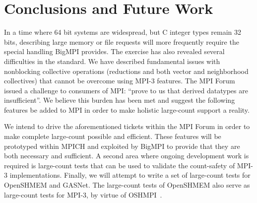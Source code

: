 
\section{Conclusions and Future Work}

In a time where 64 bit systems are widespread,
but C integer types remain 32 bits, describing large memory or file requests
will more frequently require the special handling BigMPI provides.
The exercise has also revealed several difficulties in the standard.
We have described fundamental issues with nonblocking
collective operations (reductions and both vector and neighborhood collectives)
that cannot be overcome using MPI-3 features.
The MPI Forum issued a challenge to consumers of MPI:
``prove to us that derived datatypes are insufficient''.
We believe this burden has been met and suggest the following features
be added to MPI in order to make holistic large-count support a reality.

We intend to drive the aforementioned tickets within the MPI Forum
in order to make complete large-count possible and efficient.
These features will be prototyped within MPICH and exploited by
BigMPI to provide that they are both necessary and sufficient.
A second area where ongoing development work is required is 
large-count tests that can be used to validate the count-safety of
MPI-3 implementations.
Finally, we will attempt to write a set of large-count tests for 
OpenSHMEM and GASNet.  The large-count tests of OpenSHMEM
also serve as large-count tests for MPI-3, by virtue of 
OSHMPI~\cite{hammond2014implementing}.
